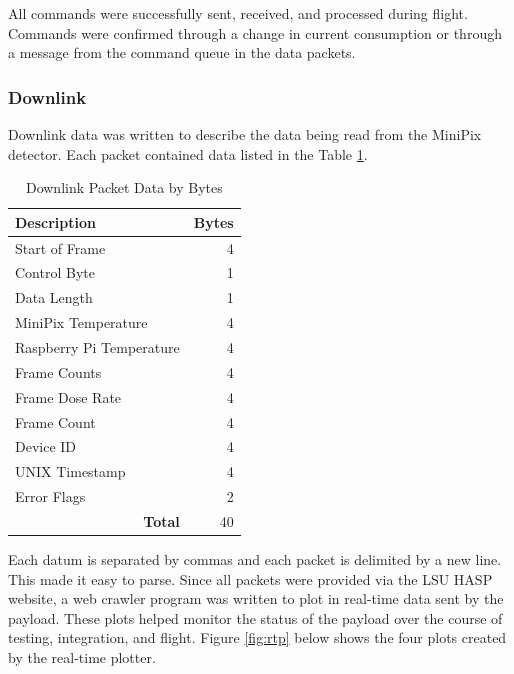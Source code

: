 All commands were successfully sent, received, and processed during flight. Commands were confirmed through  
a change in current consumption or through a message from the command queue in the data packets. 

\subsubsection{Downlink}
\label{sec:Downlink}
Downlink data was written to describe the data being read from the MiniPix detector. Each packet contained data listed in the Table \ref{tab:packets}. 

\begin{table}[H]
\centering
\caption{Downlink Packet Data by Bytes}
\label{tab:packets}
\bigskip
\begin{tabular}{l|r}
\hline
\hline
\bf{Description}					& \bf{Bytes}	\\
\hline
Start of Frame 						& 	4 			\\
\hline
Control Byte 						& 	1 			\\
\hline
Data Length 						& 	1 			\\
\hline
MiniPix Temperature 				&	4 			\\
\hline
Raspberry Pi Temperature 			& 	4 			\\
\hline
Frame Counts 						& 	4 			\\
\hline
Frame Dose Rate 					& 	4 			\\
\hline
Frame Count 						& 	4 			\\
\hline
Device ID 							& 	4 			\\
\hline
UNIX Timestamp 						& 	4 			\\
\hline
Error Flags							&	2 			\\
\hline
\multicolumn{1}{r|}{\bf{Total}}   	& 	40  		\\
\hline
\end{tabular}
\end{table}

Each datum is separated by commas and each packet is delimited by a new line. This made it easy to parse. Since all packets were provided 
via the LSU HASP website, a web crawler program was written to plot in real-time data sent by the payload. These plots helped monitor the 
status of the payload over the course of testing, integration, and flight. Figure \ref{fig:rtp} below shows the four plots created by the 
real-time plotter.

